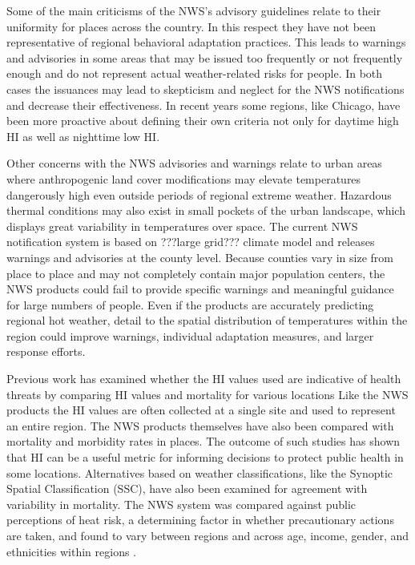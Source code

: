 \documentclass{ametsoc}
\begin{document}
Some of the main criticisms of the NWS's advisory guidelines relate to their uniformity for places across the country. In this respect they have not been representative of regional behavioral adaptation practices. This leads to warnings and advisories in some areas that may be issued too frequently or not frequently enough and do not represent actual weather-related risks for people. In both cases the issuances may lead to skepticism and neglect for the NWS notifications and decrease their effectiveness. In recent years some regions, like Chicago, have been more proactive about defining their own criteria not only for daytime high HI as well as nighttime low HI.

Other concerns with the NWS advisories and warnings relate to urban areas where anthropogenic land cover modifications may elevate temperatures dangerously high even outside periods of regional extreme weather. Hazardous thermal conditions may also exist in small pockets of the urban landscape, which displays great variability in temperatures over space.  The current NWS notification system is based on ???large grid??? climate model and releases warnings and advisories at the county level. Because counties vary in size from place to place and may not completely contain major population centers, the NWS products could fail to provide specific warnings and meaningful guidance for large numbers of people. Even if the products are accurately predicting regional hot weather, detail to the spatial distribution of temperatures within the region could improve warnings, individual adaptation measures, and larger response efforts.

Previous work has examined whether the HI values used are indicative of health threats by comparing HI values and mortality for various locations\citep{Kalkstein1989,Gaffen1998} Like the NWS products the HI values are often collected at a single site and used to represent an entire region. The NWS products themselves have also been compared with mortality and morbidity rates in places. The outcome of such studies has shown that HI can be a useful metric for informing decisions to protect public health in some locations. Alternatives based on weather classifications, like the Synoptic Spatial Classification (SSC), have also been examined for agreement with variability in mortality. The NWS system was compared against public perceptions of heat risk, a determining factor in whether precautionary actions are taken, and found to vary between regions and across age, income, gender, and ethnicities within regions \citep{Kalkstein2007}.
\end{document}
